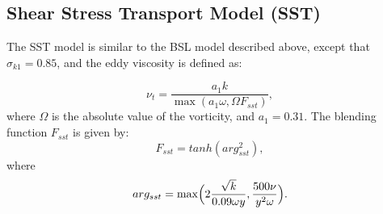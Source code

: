 \subsection{Shear Stress Transport Model (SST)}

The SST model is
similar to the BSL model described above, except that $\sigma_{k1} =
0.85$, and the eddy viscosity is defined as:

\begin{equation}
  \nu_t = \frac{a_1 k}{\max(a_1 \omega, \Omega F_{sst})},
\end{equation}
where $\Omega$ is the absolute value of the vorticity, and $a_1=0.31$.
The blending function $F_{sst}$ is
given by:
\begin{equation}
F_{sst} = tanh (arg^{2}_{sst}),
\end{equation}
where
\begin{equation}
arg_{sst} = \max \Bigl (2 \frac{\sqrt{k}}{0.09 \omega y},
\frac{500 \nu}{y^2 \omega} \Bigr).
\end{equation}
